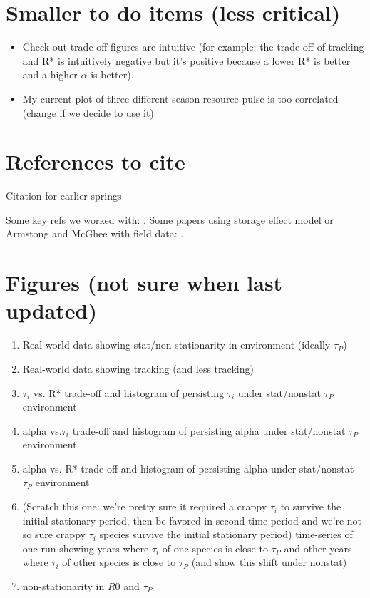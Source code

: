 \documentclass[11pt,letterpaper]{article}
\begin{document}
\section{Smaller to do items (less critical)} %
\begin{itemize}
\item Check out trade-off figures are intuitive (for example: the trade-off of tracking and R* is intuitively negative but it's positive because a lower R* is better and a higher $\alpha$ is better).
\item My current plot of three different season resource pulse is too correlated  (change if we decide to use it)
\end{itemize}

\section{References to cite}
\noindent Citation for earlier springs %

\noindent Some key refs we worked with:
\citep{Chesson:1993gi,Chesson:2000ak,Chesson:2000vd,Chesson:2004eo}. Some
papers using storage effect model or Armstong and McGhee with field
data: \citep{Angert:2009,Kuang:2008ri,Kuang:2009rj,Levine:2009ym}.



\section{Figures (not sure when last updated)}
\begin{enumerate}
\item Real-world data showing stat/non-stationarity in environment (ideally $\tau_{P}$) 
\item Real-world data showing tracking (and less tracking)
\item $\tau_{i}$ vs. R* trade-off and histogram of persisting $\tau_i$ under stat/nonstat $\tau_{P}$ environment
\item alpha vs.$\tau_i$ trade-off and histogram of persisting alpha under stat/nonstat $\tau_{P}$ environment
\item alpha vs. R* trade-off and histogram of persisting alpha under stat/nonstat $\tau_{P}$ environment
\item (Scratch this one: we're pretty sure it required a crappy $\tau_i$ to survive the initial stationary period, then be favored in second time period and we're not so sure crappy $\tau_i$ species survive the initial stationary period) time-series of one run showing years where $\tau_i$ of one species is close to $\tau_{P}$ and other years where $\tau_i$ of other species is close to $\tau_{P}$ (and show this shift under nonstat)
\item non-stationarity in $R0$ and $\tau_{P}$
\end{enumerate}
\end{document}
